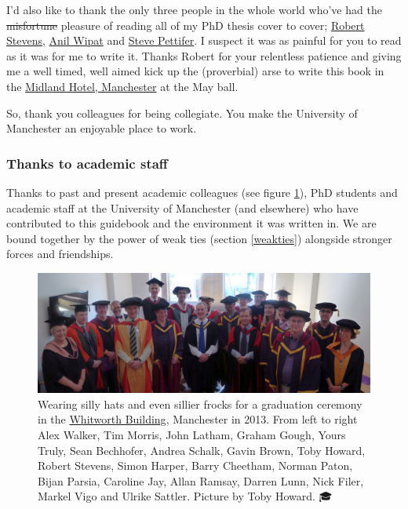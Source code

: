 \documentclass[
]{book}
\begin{document}
I'd also like to thank the only three people in the whole world who've had the \sout{misfortune} pleasure of reading all of my PhD thesis cover to cover; \href{https://en.wikipedia.org/wiki/Robert_David_Stevens}{Robert Stevens}, \href{https://www.ncl.ac.uk/computing/staff/profile/anilwipat.html}{Anil Wipat} and \href{https://en.wikipedia.org/wiki/Steve_Pettifer}{Steve Pettifer}. I suspect it was as painful for you to read as it was for me to write it. Thanks Robert for your relentless patience and giving me a well timed, well aimed kick up the (proverbial) arse to write this book in the \href{https://en.wikipedia.org/wiki/Midland_Hotel,_Manchester}{Midland Hotel, Manchester} at the May ball.

So, thank you colleagues for being collegiate. You make the University of Manchester an enjoyable place to work.

\hypertarget{academia}{%
\subsubsection{Thanks to academic staff}\label{academia}}

Thanks to past and present academic colleagues (see figure \ref{fig:academics-fig}), PhD students and academic staff at the University of Manchester (and elsewhere) who have contributed to this guidebook and the environment it was written in. We are bound together by the power of weak ties (section \ref{weakties}) alongside stronger forces and friendships.

\begin{figure}

{\centering \includegraphics[width=1\linewidth]{images/graduation-ceremony-2013} 

}

\caption{Wearing silly hats and even sillier frocks for a graduation ceremony in the \href{https://en.wikipedia.org/wiki/Whitworth_Building}{Whitworth Building}, Manchester in 2013. From left to right Alex Walker, Tim Morris, John Latham, Graham Gough, Yours Truly, Sean Bechhofer, Andrea Schalk, Gavin Brown, Toby Howard, Robert Stevens, Simon Harper, Barry Cheetham, Norman Paton, Bijan Parsia, Caroline Jay, Allan Ramsay, Darren Lunn, Nick Filer, Markel Vigo and Ulrike Sattler. Picture by Toby Howard. 🎓}\label{fig:academics-fig}
\end{figure}
\end{document}
